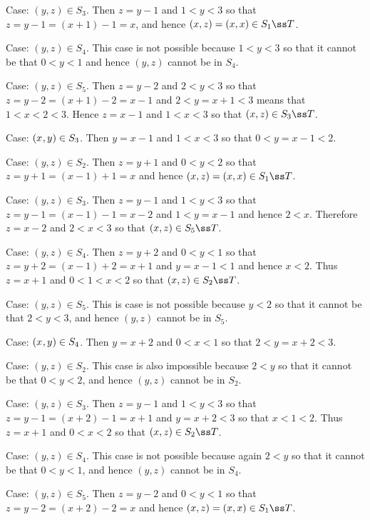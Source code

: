 {{\begin{indpar}
      Case: $(y,z) \in S_3$.
      Then $z = y-1$ and $1 < y < 3$ so that $z = y-1 = (x+1)-1 = x$, and hence $(x,z) = (x,x) \in S_1 \ss T$.

      Case: $(y,z) \in S_4$.
      This case is not possible because $1 < y < 3$ so that it cannot be that $0 < y < 1$ and hence $(y,z)$ cannot be in $S_4$.

      Case: $(y,z) \in S_5$.
      Then $z = y-2$ and $2 < y < 3$ so that $z = y-2 = (x+1)-2 = x-1$ and $2 < y = x+1 < 3$ means that $1 < x < 2 < 3$.
      Hence $z=x-1$ and $1 < x < 3$ so that $(x,z) \in S_3 \ss T$.
    \end{indpar}

    Case: $(x_{}, y_{}) \in S_3$.
    Then $y=x-1$ and $1 < x < 3$ so that $0 < y = x-1 < 2$.
    \begin{indpar}
      Case: $(y,z) \in S_2$.
      Then $z = y+1$ and $0 < y < 2$ so that $z = y+1 = (x-1)+1 = x$ and hence $(x,z) = (x,x) \in S_1 \ss T$.

      Case: $(y,z) \in S_3$.
      Then $z = y-1$ and $1 < y < 3$ so that $z = y-1 = (x-1)-1 = x-2$ and $1 < y = x-1$ and hence $2 < x$.
      Therefore $z = x-2$ and $2 < x < 3$ so that $(x,z) \in S_5 \ss T$.

      Case: $(y,z) \in S_4$.
      Then $z=y+2$ and $0 < y < 1$ so that $z = y+2 = (x-1)+2 = x+1$ and $y = x-1 < 1$ and hence $x < 2$.
      Thus $z = x+1$ and $0 < 1 < x < 2$ so that $(x,z) \in S_2 \ss T$.

      Case: $(y,z) \in S_5$.
      This is case is not possible because $y < 2$ so that it cannot be that $2 < y < 3$, and hence $(y,z)$ cannot be in $S_5$.
    \end{indpar}

    Case: $(x_{}, y_{}) \in S_4$.
    Then $y=x+2$ and $0 < x < 1$ so that $2 < y = x+2 < 3$.
    \begin{indpar}
      Case: $(y,z) \in S_2$.
      This case is also impossible because $2 < y$  so that it cannot be that $0 < y < 2$, and hence $(y,z)$ cannot be in $S_2$.

      Case: $(y,z) \in S_3$.
      Then $z = y-1$ and $1 < y < 3$ so that $z = y-1 = (x+2)-1 = x+1$ and $y = x+2 < 3$ so that $x < 1 < 2$.
      Thus $z = x+1$ and $0 < x < 2$ so that $(x,z) \in S_2 \ss T$.

      Case: $(y,z) \in S_4$.
      This case is not possible because again $2 < y$ so that it cannot be that $0 < y < 1$, and hence $(y,z)$ cannot be in $S_4$.

      Case: $(y,z) \in S_5$.
      Then $z=y-2$ and $0 < y <1$ so that $z=y-2=(x+2)-2=x$ and hence $(x,z) = (x,x) \in S_1 \ss T$.
    \end{indpar}

}}
